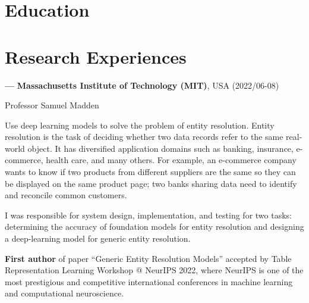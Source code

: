 \documentclass[10pt,a4paper,sans]{./moderncv/moderncv}
\begin{document}
\maketitle


\section{Education}

\section{Research Experiences}

\cvline
{\textbf{\Large ---}}
{\large\textbf{Massachusetts Institute of Technology (MIT)}, USA (2022/06-08)}

{Professor Samuel Madden}

{Use deep learning models to solve the problem of entity resolution. Entity resolution is the task of deciding whether two data records refer to the same real-world object. It has diversified application domains such as banking, insurance, e-commerce, health care, and many others. For example, an e-commerce company wants to know if two products from different suppliers are the same so they can be displayed on the same product page; two banks sharing data need to identify and reconcile common customers.}

{I was responsible for system design, implementation, and testing for two tasks: determining the accuracy of foundation models for entity resolution and designing a deep-learning model for generic entity resolution.}

{\textbf{First author} of paper ``Generic Entity Resolution Models'' accepted by Table Representation Learning Workshop @ NeurIPS 2022, where NeurIPS is one of the most prestigious and competitive international conferences in machine learning and computational neuroscience.}
\end{document}
